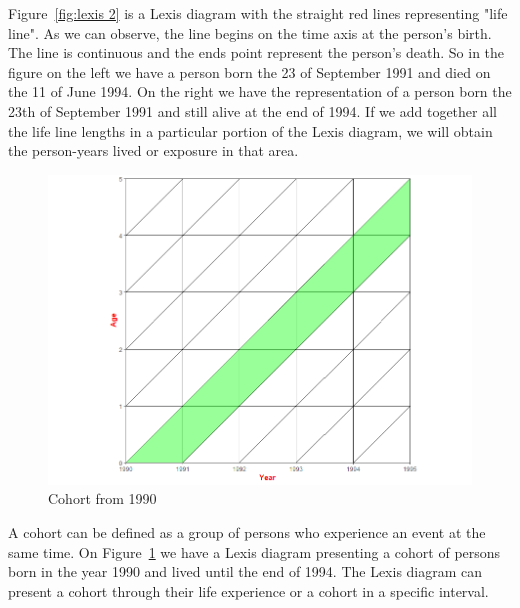 Figure~\ref{fig:lexis 2} is a Lexis diagram  with the straight red lines representing  "life line". As we can observe, the line begins on the time axis at the person's birth. The line is continuous and the ends point represent the person's death. So in the figure on the left we have a person born the 23 of September 1991 and died on the 11 of June 1994. On the right we have the representation of a person born the 23th of September 1991 and still alive at the end of 1994. If we add together all the life line lengths in a particular portion of the Lexis diagram, we will obtain the person-years lived or exposure in that area. %
   
     \begin{figure}[tbh]
         \centering
          \includegraphics[scale=0.4]{figures/lexis_cohort.png}
          \caption{Cohort from 1990}
          \label{fig:lexis 3}
        \end{figure}  
   

A cohort can be defined as a group of persons who experience an event at the same time. On Figure~\ref{fig:lexis 3} we have a Lexis diagram presenting a cohort of persons born in the year 1990 and lived until the end of 1994. The Lexis diagram can present a cohort through their life experience or a cohort in a specific interval.    
    
